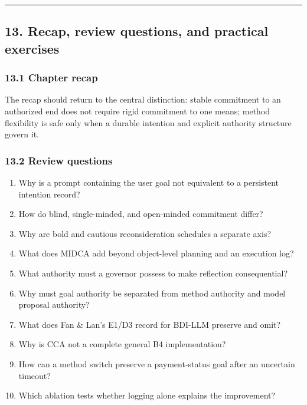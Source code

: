 \begin{center}\rule{0.5\linewidth}{0.5pt}\end{center}

\subsection{13. Recap, review questions, and practical exercises}\label{recap-review-questions-and-practical-exercises}

\subsubsection{13.1 Chapter recap}\label{chapter-recap}

The recap should return to the central distinction: stable commitment to an authorized end does not require rigid commitment to one means; method flexibility is safe only when a durable intention and explicit authority structure govern it.

\subsubsection{13.2 Review questions}\label{review-questions}

\begin{enumerate}
\def\labelenumi{\arabic{enumi}.}
\tightlist
\item
  Why is a prompt containing the user goal not equivalent to a persistent intention record?
\item
  How do blind, single-minded, and open-minded commitment differ?
\item
  Why are bold and cautious reconsideration schedules a separate axis?
\item
  What does MIDCA add beyond object-level planning and an execution log?
\item
  What authority must a governor possess to make reflection consequential?
\item
  Why must goal authority be separated from method authority and model proposal authority?
\item
  What does Fan \& Lan's E1/D3 record for BDI-LLM preserve and omit?
\item
  Why is CCA not a complete general B4 implementation?
\item
  How can a method switch preserve a payment-status goal after an uncertain timeout?
\item
  Which ablation tests whether logging alone explains the improvement?
\end{enumerate}

